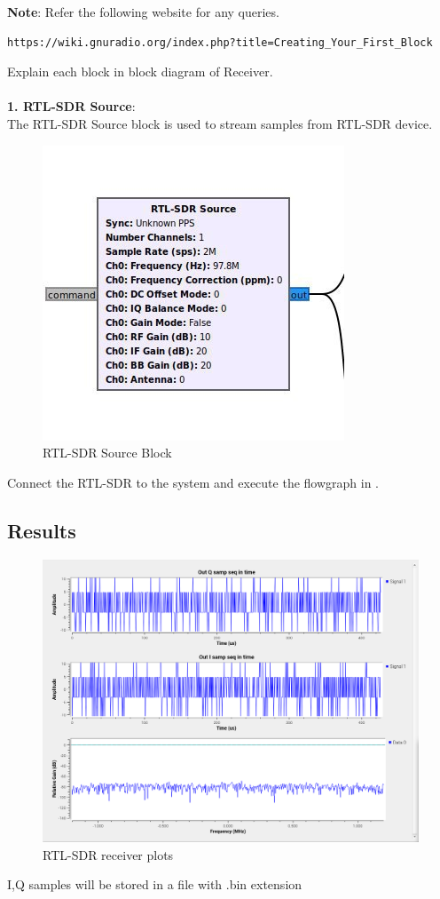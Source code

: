 \textbf{Note}:
Refer the following website for any queries.
\begin{lstlisting}
https://wiki.gnuradio.org/index.php?title=Creating_Your_First_Block
\end{lstlisting}
 Explain each block in block diagram of Receiver.\\
	\solution \\
\textbf{1. RTL-SDR Source}:\\
The RTL-SDR Source block is used to stream samples from RTL-SDR device.
\begin{figure}[H]
\centering
\includegraphics[width=0.4\columnwidth]{figs/source_block.png}
\caption{RTL-SDR Source Block}
\label{fig:source block}
\end{figure}
Connect the RTL-SDR to the system and execute the flowgraph in .\\



\subsection{Results} 
\begin{figure}
\includegraphics[width=0.8\columnwidth]{figs/RTL_sdr_res.png}
\caption{RTL-SDR receiver plots}
\end{figure}
I,Q samples will be stored in a file with .bin extension

